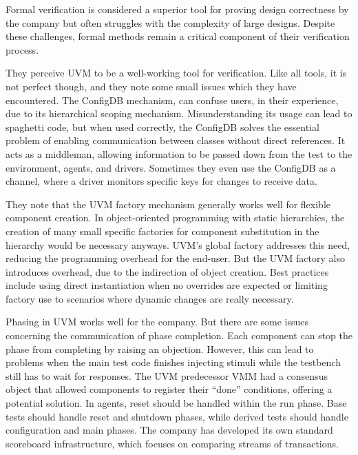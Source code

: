 Formal verification is considered a superior tool for proving design correctness by the company but often struggles with the
complexity of large designs. Despite these challenges, formal methods remain a critical component of their verification process.

They perceive UVM to be a well-working tool for verification. Like all tools, it is not perfect though, and they note
some small issues which they have encountered. The ConfigDB mechanism, can confuse users, in their experience, due to its
hierarchical scoping mechanism. Misunderstanding its usage can lead to spaghetti code, but when used correctly, the
ConfigDB solves the essential problem of enabling communication between classes without direct references. It acts as
a middleman, allowing information to be passed down from the test to the environment, agents, and drivers. Sometimes
they even use the ConfigDB as a channel, where a driver monitors specific keys for changes to receive data.

They note that the UVM factory mechanism generally works well for flexible component creation. In object-oriented
programming with static hierarchies, the creation of many small specific factories for component substitution in the
hierarchy would be necessary anyways. UVM's global factory addresses this need, reducing the programming overhead for
the end-user. But the UVM factory also introduces overhead, due to the indirection of object creation. Best practices
include using direct instantiation when no overrides are expected or limiting factory use to scenarios where dynamic
changes are really necessary.

Phasing in UVM works well for the company. But there are some issues concerning the communication of phase
completion. Each component can stop the phase from completing by raising an objection. However, this can lead to
problems when the main test code finishes injecting stimuli while the testbench still has to wait for responses. The
UVM predecessor VMM had a consensus object that allowed components to register their “done” conditions, offering a potential
solution. In agents, reset should be handled within the run phase. Base tests should handle reset and shutdown
phases, while derived tests should handle configuration and main phases. The company has developed its own standard
scoreboard infrastructure, which focuses on comparing streams of transactions.

